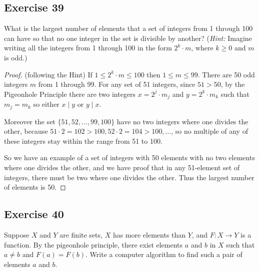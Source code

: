 \documentclass[14pt]{extarticle}
\begin{document}
\subsection{Exercise 39}
What is the largest number of elements that a set of integers from 1 through 100 can have so that no one integer
in the set is divisible by another? ({\it Hint:} Imagine writing all the integers from 1 through 100 in the form
\(2^k \cdot m\), where \(k \geq 0\) and \(m\) is odd.)

\begin{proof}
     (following the Hint) If \(1 \leq 2^k \cdot m \leq 100\) then \(1 \leq m \leq 99\). There are 50 odd integers \(m\)
     from 1 through 99. For any set of 51 integers, since \(51 > 50\), by the Pigeonhole Principle there are two integers
     \(x = 2^j \cdot m_j\) and \(y = 2^k \cdot m_k\) such that \(m_j = m_k\) so either \(x \mid y\) or \(y \mid x\).

     Moreover the set \(\{51, 52, \ldots, 99, 100\}\) have no two integers where one divides the other, because
     \(51 \cdot 2 = 102 > 100, 52 \cdot 2 = 104 > 100, \ldots\), so no multiple of any of these integers stay within the
     range from 51 to 100.

     So we have an example of a set of integers with 50 elements with no two elements where one divides the other, and we
     have proof that in any 51-element set of integers, there must be two where one divides the other. Thus the largest
     number of elements is 50.
\end{proof}

\subsection{Exercise 40}
Suppose \(X\) and \(Y\) are finite sets, \(X\) has more elements than \(Y\), and \(F: X \to Y\) is a function. By
the pigeonhole principle, there exist elements \(a\) and \(b\) in \(X\) such that \(a \neq b\) and \(F(a) = F(b)\).
Write a computer algorithm to find such a pair of elements \(a\) and \(b\).
\end{document}
